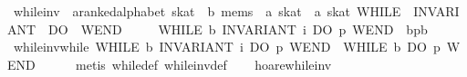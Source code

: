 \begin{isabellebody}
\ while{}inv\ {}{}\ {}{}a{}{}ranked{}alphabet\ skat\ {}\ {}b\ mems\ {}\ {}a\ skat\ {}\ {}a\ skat{}\ {}{}WHILE\ {}\ INVARIANT\ {}\ DO\ {}\ WEND{}\ {}{}{}{}{}{}{}{}{}{}\ {}{}{}\ \isanewline
\ \ {}WHILE\ b\ INVARIANT\ i\ DO\ p\ WEND\ {}\ {}b{}p{}b{}\isanewline
\isanewline
\ \ \isamarkupfalse%
\ while{}inv{}while{}\ {}WHILE\ b\ INVARIANT\ i\ DO\ p\ WEND\ {}\ WHILE\ b\ DO\ p\ WEND{}\isanewline
%
\isadelimproof
\ \ \ \ %
\endisadelimproof
%
\isatagproof
{}\isamarkupfalse%
\ {}metis\ while{}def\ while{}inv{}def{}%
\endisatagproof
{\isafoldproof}%
%
\isadelimproof
\isanewline
%
\endisadelimproof
\isanewline
\ \ \isamarkupfalse%
\ hoare{}while{}inv{}\isanewline

\end{isabellebody}
